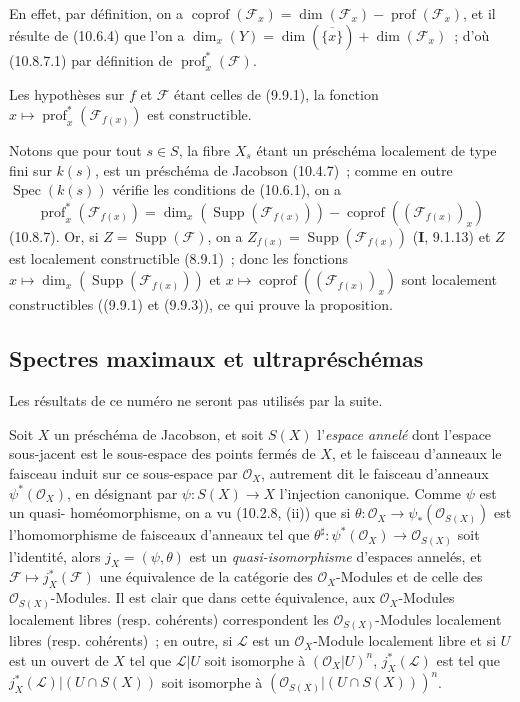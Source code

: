 En effet, par définition, on a
$\operatorname{coprof}(\mathcal F_x)
=\dim(\mathcal F_x)-\operatorname{prof}(\mathcal F_x)$, et il résulte de (10.6.4) que
l'on a $\dim_x(Y)=\dim(\overline{\{x\}})+\dim(\mathcal F_x)$~; d'où (10.8.7.1) par
définition de $\operatorname{prof}^{*}_{x}(\mathcal F)$.

\begin{corollary}[10.8.8]
\label{IV.10.8.8-fr}
Les hypothèses sur $f$ et $\mathcal F$ étant celles de (9.9.1), la fonction
$x\mapsto\operatorname{prof}^{*}_{x}(\mathcal F_{f(x)})$ est constructible.
\end{corollary}

Notons que pour tout $s\in S$, la fibre $X_s$ étant un préschéma localement de
type fini sur $k(s)$, est un préschéma de Jacobson (10.4.7)~; comme en outre
$\operatorname{Spec}(k(s))$ vérifie les conditions de (10.6.1), on a
\[
  \operatorname{prof}^{*}_{x}(\mathcal F_{f(x)})
  =\dim_x(\operatorname{Supp}(\mathcal F_{f(x)}))
  -\operatorname{coprof}((\mathcal F_{f(x)})_x)
\]
(10.8.7). Or, si $Z=\operatorname{Supp}(\mathcal F)$, on a
$Z_{f(x)}=\operatorname{Supp}(\mathcal F_{f(x)})$ (\textbf{I}, 9.1.13) et $Z$ est
localement constructible (8.9.1)~; donc les fonctions
$x\mapsto\dim_x(\operatorname{Supp}(\mathcal F_{f(x)}))$ et
$x\mapsto\operatorname{coprof}((\mathcal F_{f(x)})_x)$ sont localement
constructibles ((9.9.1) et (9.9.3)), ce qui prouve la proposition.

\subsection{Spectres maximaux et ultrapréschémas}
\label{subsection:IV.10.9-fr}

Les résultats de ce numéro ne seront pas utilisés par la suite.

\begin{env}[10.9.1]
\label{IV.10.9.1-fr}
Soit $X$ un préschéma de Jacobson, et soit $S(X)$ l'\emph{espace annelé} dont
l'espace sous-jacent est le sous-espace des points fermés de $X$, et le faisceau
d'anneaux le faisceau induit sur ce sous-espace par $\mathcal O_X$, autrement dit
le faisceau d'anneaux $\psi^*(\mathcal O_X)$, en désignant par
$\psi:S(X)\to X$ l'injection canonique. Comme $\psi$ est un quasi-
homéomorphisme, on a vu (10.2.8, (ii)) que si
$\theta:\mathcal O_X\to\psi_*(\mathcal O_{S(X)})$ est l'homomorphisme de
faisceaux d'anneaux tel que
$\theta^\sharp:\psi^*(\mathcal O_X)\to\mathcal O_{S(X)}$ soit l'identité,
alors $j_X=(\psi,\theta)$ est un \emph{quasi-isomorphisme} d'espaces annelés,
et $\mathcal F\mapsto j_X^*(\mathcal F)$ une équivalence de la catégorie des
$\mathcal O_X$-Modules et de celle des $\mathcal O_{S(X)}$-Modules. Il est clair
que dans cette équivalence, aux $\mathcal O_X$-Modules localement libres (resp.
cohérents) correspondent les $\mathcal O_{S(X)}$-Modules localement libres
(resp. cohérents)~; en outre, si $\mathcal L$ est un $\mathcal O_X$-Module
localement libre et si $U$ est un ouvert de $X$ tel que $\mathcal L|U$ soit
isomorphe à $(\mathcal O_X|U)^n$, $j_X^*(\mathcal L)$ est tel que
$j_X^*(\mathcal L)|(U\cap S(X))$ soit isomorphe à
$(\mathcal O_{S(X)}|(U\cap S(X)))^n$.
\end{env}

